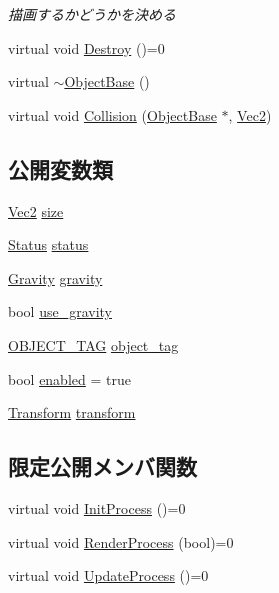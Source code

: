 \begin{DoxyCompactItemize}
\begin{DoxyCompactList}\small\item\em 描画するかどうかを決める \end{DoxyCompactList}\item 
virtual void \mbox{\hyperlink{class_object_base_a7fa4c548153c3af20f89673ffea809af}{Destroy}} ()=0
\item 
virtual \mbox{\hyperlink{class_object_base_a7074bc9389069351c2d0eee6a47e5ee3}{$\sim$\+Object\+Base}} ()
\item 
virtual void \mbox{\hyperlink{class_object_base_a3e1db79dfa119be067d816c22d09839d}{Collision}} (\mbox{\hyperlink{class_object_base}{Object\+Base}} $\ast$, \mbox{\hyperlink{common_8h_ae148fff5818e9444b4ab2288829559bf}{Vec2}})
\end{DoxyCompactItemize}
\subsection*{公開変数類}
\begin{DoxyCompactItemize}
\item 
\mbox{\hyperlink{common_8h_ae148fff5818e9444b4ab2288829559bf}{Vec2}} \mbox{\hyperlink{class_object_base_a82ab5370f1e5f21005131f719e06c1af}{size}}
\item 
\mbox{\hyperlink{class_status}{Status}} \mbox{\hyperlink{class_object_base_a03b285263802692be1f3a9a7b13e5344}{status}}
\item 
\mbox{\hyperlink{class_gravity}{Gravity}} \mbox{\hyperlink{class_object_base_a570bfa03730e906989187bfbcad95c51}{gravity}}
\item 
bool \mbox{\hyperlink{class_object_base_aab135a2a04e76046804f01b63df4f35c}{use\+\_\+gravity}}
\item 
\mbox{\hyperlink{object__base_8h_a0eff9883ab049ee02773dde19d057c0c}{O\+B\+J\+E\+C\+T\+\_\+\+T\+AG}} \mbox{\hyperlink{class_object_base_aff7eb5482ca9bc1cd30b84994d0dad8b}{object\+\_\+tag}}
\item 
bool \mbox{\hyperlink{class_object_base_ade1c868f20653a6fa5236544120eca2b}{enabled}} = true
\item 
\mbox{\hyperlink{common_8h_a1c43cb8f0d8a41901f3ce4c67dbbce20}{Transform}} \mbox{\hyperlink{class_object_base_ac8096c26fe09682da6119208d392dc62}{transform}}
\end{DoxyCompactItemize}
\subsection*{限定公開メンバ関数}
\begin{DoxyCompactItemize}
\item 
virtual void \mbox{\hyperlink{class_object_base_af133f36f2bca1dcfd962e2cfac61ab51}{Init\+Process}} ()=0
\item 
virtual void \mbox{\hyperlink{class_object_base_aeac51d868beeb7f7fe900407b76b93a2}{Render\+Process}} (bool)=0
\item 
virtual void \mbox{\hyperlink{class_object_base_a8b5b72b363a419767efde0b0e692ea95}{Update\+Process}} ()=0
\end{DoxyCompactItemize}

